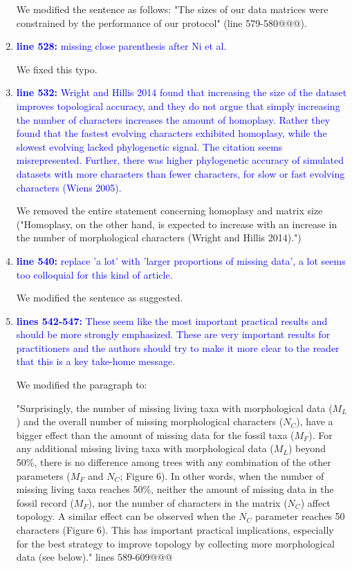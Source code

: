 \documentclass[12pt,letterpaper]{article}
\begin{document}
\begin{enumerate}
We modified the sentence as follows: "The sizes of our data matrices were constrained by the performance of our protocol" (line 579-580@@@).

\item{\textcolor{blue}{\textbf{line 528:} missing close parenthesis after Ni et al.}}

We fixed this typo.

\item{\textcolor{blue}{\textbf{line 532:} Wright and Hillis 2014 found that increasing the size of the dataset improves topological accuracy, and they do not argue that simply increasing the number of characters increases the amount of homoplasy. Rather they found that the fastest evolving characters exhibited homoplasy, while the slowest evolving lacked phylogenetic signal. The citation seems misrepresented. Further, there was higher phylogenetic accuracy of simulated datasets with more characters than fewer characters, for slow or fast evolving characters (Wiens 2005).}}

We removed the entire statement concerning homoplasy and matrix size ("Homoplasy, on the other hand, is expected to increase with an increase in the number of morphological characters (Wright and Hillis 2014).")

\item{\textcolor{blue}{\textbf{line 540:} replace 'a lot' with 'larger proportions of missing data', a lot seems too colloquial for this kind of article. }}

We modified the sentence as suggested.

\item{\textcolor{blue}{\textbf{lines 542-547:} These seem like the most important practical results and should be more strongly emphasized. These are very important results for practitioners and the authors should try to make it more clear to the reader that this is a key take-home message.}}

We modified the paragraph to:

"Surprisingly, the number of missing living taxa with morphological data ($M_{L}$) and the overall number of missing morphological characters ($N_{C}$), have a bigger effect than the amount of missing data for the fossil taxa ($M_{F}$).
For any additional missing living taxa with morphological data ($M_L$) beyond 50\%, there is no difference among trees with any combination of the other parameters ($M_F$ and $N_C$; Figure 6).
In other words, when the number of missing living taxa reaches 50\%, neither the amount of missing data in the fossil record ($M_F$), nor the number of characters in the matrix ($N_C$) affect topology.
A similar effect can be observed when the $N_C$ parameter reaches 50 characters (Figure 6).
This has important practical implications, especially for the best strategy to improve topology by collecting more morphological data (see below)." lines 589-609@@@


\end{enumerate}
\end{document}
